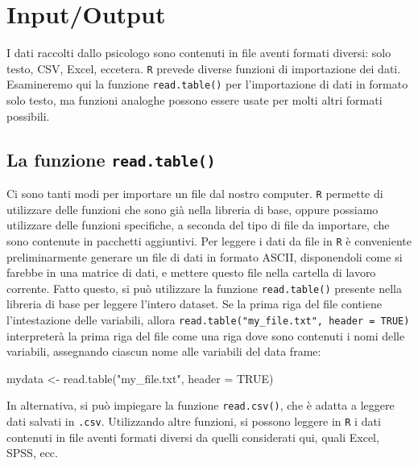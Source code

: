 \documentclass[
  11pt,
]{krantz}
\makeatletter
\newenvironment{Shaded}{\begin{snugshade}}{\end{snugshade}}
\newcommand{\AttributeTok}[1]{\textcolor[rgb]{0.61,0.61,0.61}{#1}}
\newcommand{\ConstantTok}[1]{\textcolor[rgb]{0,0,0}{#1}}
\newcommand{\FunctionTok}[1]{\textcolor[rgb]{0,0,0}{#1}}
\newcommand{\NormalTok}[1]{#1}
\newcommand{\OtherTok}[1]{\textcolor[rgb]{0.37,0.37,0.37}{#1}}
\newcommand{\StringTok}[1]{\textcolor[rgb]{0.5,0.5,0.5}{#1}}
\newenvironment{kframe}{%
\medskip{}
\setlength{\fboxsep}{.8em}
 \def\at@end@of@kframe{}%
 \ifinner\ifhmode%
  \def\at@end@of@kframe{\end{minipage}}%
  \begin{minipage}{\columnwidth}%
 \fi\fi%
 \def\FrameCommand##1{\hskip\@totalleftmargin \hskip-\fboxsep
 \colorbox{shadecolor}{##1}\hskip-\fboxsep
     \hskip-\linewidth \hskip-\@totalleftmargin \hskip\columnwidth}%
 \MakeFramed {\advance\hsize-\width
   \@totalleftmargin\z@ \linewidth\hsize
   \@setminipage}}%
 {\par\unskip\endMakeFramed%
 \at@end@of@kframe}
\renewenvironment{Shaded}{\begin{kframe}}{\end{kframe}}
\theoremstyle{definition}
\theoremstyle{definition}
\theoremstyle{definition}
\theoremstyle{definition}
\theoremstyle{remark}
\makeatother
\begin{document}
\hypertarget{chapter-input-output}{%
\section{Input/Output}\label{chapter-input-output}}

I dati raccolti dallo psicologo sono contenuti in file aventi formati diversi: solo testo, CSV, Excel, eccetera. \texttt{R} prevede diverse funzioni di importazione dei dati. Esamineremo qui la funzione \texttt{read.table()} per l'importazione di dati in formato solo testo, ma funzioni analoghe possono essere usate per molti altri formati possibili.

\hypertarget{la-funzione-read.table}{%
\subsection{\texorpdfstring{La funzione \texttt{read.table()}}{La funzione read.table()}}\label{la-funzione-read.table}}

Ci sono tanti modi per importare un file dal nostro computer. \texttt{R} permette di utilizzare delle funzioni che sono già nella libreria di base, oppure possiamo utilizzare delle funzioni specifiche, a seconda del tipo di file da importare, che sono contenute in pacchetti aggiuntivi. Per leggere i dati da file in \texttt{R} è conveniente preliminarmente generare un file di dati in formato ASCII, disponendoli come si farebbe in una matrice di dati, e mettere questo file nella cartella di lavoro corrente. Fatto questo, si può utilizzare la funzione \texttt{read.table()} presente nella libreria di base per leggere l'intero dataset. Se la prima riga del file contiene l'intestazione delle variabili, allora \texttt{read.table("my\_file.txt",\ header\ =\ TRUE)} interpreterà la prima riga del file come una riga dove sono contenuti i nomi delle variabili, assegnando ciascun nome alle variabili del data frame:

\begin{Shaded}
\begin{Highlighting}[]
\NormalTok{mydata }\OtherTok{\textless{}{-}} \FunctionTok{read.table}\NormalTok{(}\StringTok{"my\_file.txt"}\NormalTok{, }\AttributeTok{header =} \ConstantTok{TRUE}\NormalTok{)}
\end{Highlighting}
\end{Shaded}

In alternativa, si può impiegare la funzione \texttt{read.csv()}, che è adatta a leggere dati salvati in \texttt{.csv}. Utilizzando altre funzioni, si possono leggere in \texttt{R} i dati contenuti in file aventi formati diversi da quelli considerati qui, quali Excel, SPSS, ecc.
\end{document}
